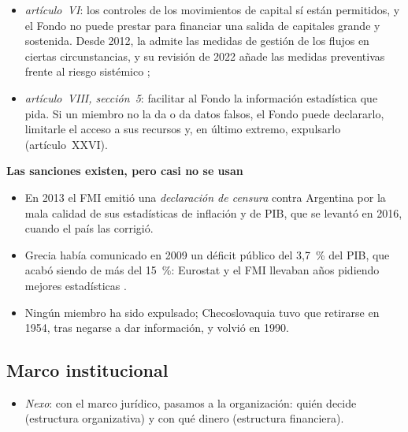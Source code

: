 \documentclass[11pt]{article}
\begin{document}
\begin{itemize}
\begin{itemize}
  \item \emph{artículo~VI}: los controles de los movimientos de capital sí están permitidos, y el Fondo no puede prestar para financiar una salida de capitales grande y sostenida. Desde 2012, la  admite las medidas de gestión de los flujos en ciertas circunstancias, y su revisión de 2022 añade las medidas preventivas frente al riesgo sistémico\nocite{FMI2012VisionInstitucional,FMI2022RevisionVI} ;
  \item \emph{artículo~VIII, sección~5}: facilitar al Fondo la información estadística que pida. Si un miembro no la da o da datos falsos, el Fondo puede declararlo, limitarle el acceso a sus recursos y, en último extremo, expulsarlo (artículo~XXVI).
  \end{itemize}
\end{itemize}

\begin{anotaciones}
\textbf{Las sanciones existen, pero casi no se usan}
\begin{itemize}
\item En 2013 el FMI emitió una \emph{declaración de censura} contra Argentina por la mala calidad de sus estadísticas de inflación y de PIB, que se levantó en 2016, cuando el país las corrigió\nocite{FMI2013ArgentinaCensura}.
\item Grecia había comunicado en 2009 un déficit público del 3,7~\% del PIB, que acabó siendo de más del 15~\%: Eurostat y el FMI llevaban años pidiendo mejores estadísticas\nocite{Eurostat2010Grecia} .
\item Ningún miembro ha sido expulsado; Checoslovaquia tuvo que retirarse en 1954, tras negarse a dar información, y volvió en 1990.
\end{itemize}
\end{anotaciones}

\subsection{Marco institucional}\label{sec:institucional}

\begin{itemize}
\item \emph{Nexo}: con el marco jurídico, pasamos a la organización: quién decide (estructura organizativa) y con qué dinero (estructura financiera).
\end{itemize}
\end{document}
